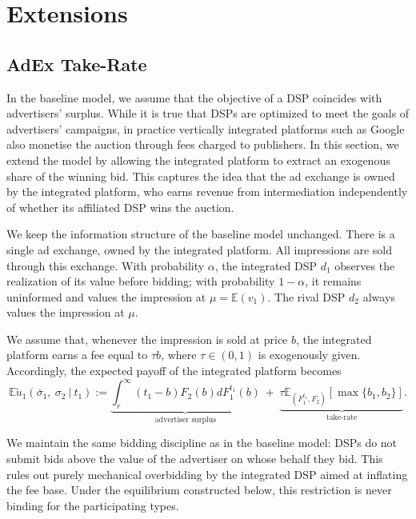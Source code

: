 \documentclass[11pt]{article}
\theoremstyle{plain}
\theoremstyle{definition}
\theoremstyle{plain}
\theoremstyle{plain}
\theoremstyle{plain}
\theoremstyle{plain}
\numberwithin{equation}{section}
\begin{document}
\section{Extensions}

\subsection{AdEx Take-Rate}

In the baseline model, we assume that the objective of a DSP coincides with advertisers' surplus. While it is true that DSPs are optimized to meet the goals of advertisers' campaigns, in practice vertically integrated platforms such as Google also monetise the auction through fees charged to publishers. In this section, we extend the model by allowing the integrated platform to extract an exogenous share of the winning bid. This captures the idea that the ad exchange is owned by the integrated platform, who earns revenue from intermediation independently of whether its affiliated DSP wins the auction.

We keep the information structure of the baseline model unchanged. There is a single ad exchange, owned by the integrated platform. All impressions are sold through this exchange. With probability $ \alpha $, the integrated DSP $ d_1 $ observes the realization of its value before
bidding; with probability $ 1 - \alpha $, it remains uninformed and values the impression at $ \mu = \mathbb{E}(v_1) $. The rival DSP $ d_2 $ always values the impression at $ \mu $.

We assume that, whenever the impression is sold at price $ b $, the integrated platform earns a fee equal to $ \tau b $, where $ \tau \in (0,1) $ is exogenously given. Accordingly, the expected payoff of the integrated platform becomes
\begin{equation*}
 \mathbb{E}\tilde{u}_1 \left( \overline{\sigma}_1, \ \sigma_2 \ \big| \ t_1  \right) := \underbrace{\int_{r}^{\infty} (t_1 - b) F_2(b) d F_1^{t_1}(b)}_\text{advertiser surplus} \ + \ \underbrace{\tau \mathbb{E}_{\left({F_1^{t_1}, F_2}\right)} [\max \{ b_1, b_2 \}]}_\text{take-rate}.    
\end{equation*}

We maintain the same bidding discipline as in the baseline model: DSPs do not submit bids above the value of the advertiser on whose behalf they bid. This rules out purely mechanical overbidding by the integrated DSP aimed at inflating the fee base. Under the equilibrium constructed below, this restriction is never binding for the participating types.
\end{document}
